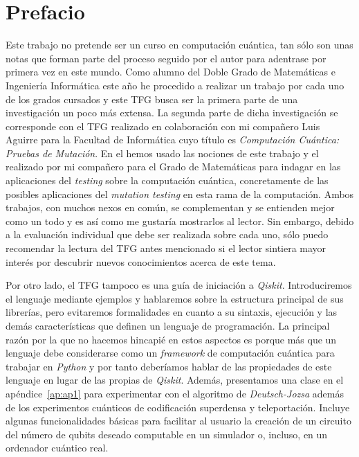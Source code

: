 \chapter*{Prefacio}

Este trabajo no pretende ser un curso en computación cuántica, tan sólo son unas notas que forman parte del proceso seguido por el autor para adentrase por primera vez en este mundo. Como alumno del Doble Grado de Matemáticas e Ingeniería Informática este año he procedido a realizar un trabajo por cada uno de los grados cursados y este TFG busca ser la primera parte de una investigación un poco más extensa. La segunda parte de dicha investigación se corresponde con el TFG realizado en colaboración con mi compañero Luis Aguirre para la Facultad de Informática cuyo título es \textit{Computación Cuántica: Pruebas de Mutación}. En el hemos usado las nociones de este trabajo y el realizado por mi compañero para el Grado de Matemáticas para indagar en las aplicaciones del \textit{testing} sobre la computación cuántica, concretamente de las posibles aplicaciones del \textit{mutation testing} en esta rama de la computación. Ambos trabajos, con muchos nexos en común, se complementan y se entienden mejor como un todo y es así como me gustaría mostrarlos al lector. Sin embargo, debido a la evaluación individual que debe ser realizada sobre cada uno, sólo puedo recomendar la lectura del TFG antes mencionado si el lector sintiera mayor interés por descubrir nuevos conocimientos acerca de este tema.

Por otro lado, el TFG tampoco es una guía de iniciación a \textit{Qiskit}. Introduciremos el lenguaje mediante ejemplos y hablaremos sobre la estructura principal de sus librerías, pero evitaremos formalidades en cuanto a su sintaxis, ejecución y las demás características que definen un lenguaje de programación. La principal razón por la que no hacemos hincapié en estos aspectos es porque más que un lenguaje debe considerarse como un \textit{framework} de computación cuántica para trabajar en \textit{Python} y por tanto deberíamos hablar de las propiedades de este lenguaje en lugar de las propias de \textit{Qiskit}. Además, presentamos una clase en el apéndice~\ref{ap:ap1} para experimentar con el algoritmo de \textit{Deutsch-Jozsa} además de los experimentos cuánticos de codificación superdensa y teleportación. Incluye algunas funcionalidades básicas para facilitar al usuario la creación de un circuito del número de qubits deseado computable en un simulador o, incluso, en un ordenador cuántico real.

